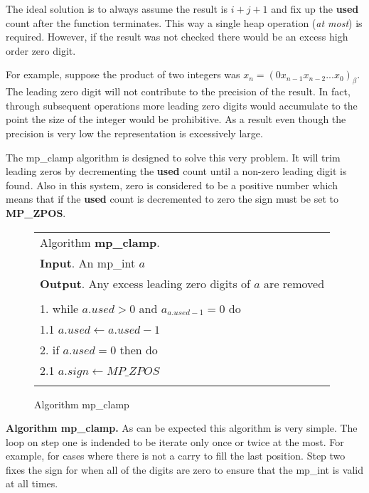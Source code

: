 \documentclass[b5paper]{book}
\begin{document}
The ideal solution is to always assume the result is $i + j + 1$ and fix up the \textbf{used} count after the function
terminates.  This way a single heap operation (\textit{at most}) is required.  However, if the result was not checked
there would be an excess high order zero digit.  

For example, suppose the product of two integers was $x_n = (0x_{n-1}x_{n-2}...x_0)_{\beta}$.  The leading zero digit 
will not contribute to the precision of the result.  In fact, through subsequent operations more leading zero digits would
accumulate to the point the size of the integer would be prohibitive.  As a result even though the precision is very 
low the representation is excessively large.  

The mp\_clamp algorithm is designed to solve this very problem.  It will trim leading zeros by decrementing the 
\textbf{used} count until a non-zero leading digit is found.  Also in this system, zero is considered to be a positive 
number which means that if the \textbf{used} count is decremented to zero the sign must be set to \textbf{MP\_ZPOS}.

\begin{figure}[here]
\begin{center}
\begin{tabular}{l}
\hline Algorithm \textbf{mp\_clamp}. \\
\textbf{Input}.   An mp\_int $a$ \\
\textbf{Output}.  Any excess leading zero digits of $a$ are removed \\
\hline \\
1.  while $a.used > 0$ and $a_{a.used - 1} = 0$ do \\
\hspace{+3mm}1.1  $a.used \leftarrow a.used - 1$ \\
2.  if $a.used = 0$ then do \\
\hspace{+3mm}2.1  $a.sign \leftarrow MP\_ZPOS$ \\
\hline \\
\end{tabular}
\end{center}
\caption{Algorithm mp\_clamp}
\end{figure}

\textbf{Algorithm mp\_clamp.}
As can be expected this algorithm is very simple.  The loop on step one is indended to be iterate only once or twice at
the most.  For example, for cases where there is not a carry to fill the last position.  Step two fixes the sign for 
when all of the digits are zero to ensure that the mp\_int is valid at all times.
\end{document}
